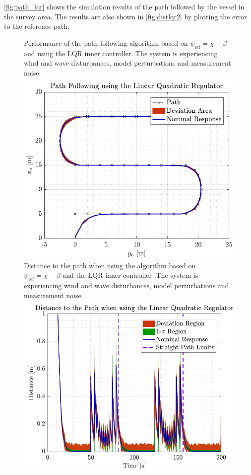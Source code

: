 \autoref{fig:path_lqr} shows the simulation results of the path followed by the vessel in the survey area. The results are also shown in \autoref{fig:distlqr2} by plotting the error to the reference path.
\begin{figure}[H]
    \captionbox  
    {            
        Performance of the path following algorithm based on $\psi_\mathrm{ref}=\chi-\beta$ and using the LQR inner controller. The system is experiencing wind and wave disturbances, model perturbations and measurement noise.            
        \label{fig:path_lqr}                               
    }                                                                
    {                                                                 
        \includegraphics[width=.45\textwidth]{figures/path_lqr}    
    }                                                                  
    \hspace{5pt}                                                        
    \captionbox 
    {       
        Distance to the path when using the algorithm based on $\psi_\mathrm{ref}=\chi-\beta$ and the LQR inner controller .The system is experiencing wind and wave disturbances, model perturbations and measurement noise.                                                                  %
        \label{fig:distlqr2}                                  
    }                                                                          
    {                                                                            
        \includegraphics[width=.45\textwidth]{figures/dist_lqr}          
    }                                                                            
\end{figure}

